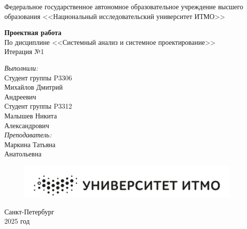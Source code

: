 \documentclass[12pt]{report}
\begin{document}
	
	\begin{titlepage}
		\begin{center}
			\large{Федеральное государственное автономное образовательное учреждение высшего образования <<Национальный исследовательский университет ИТМО>>}
		\end{center}
		
		\vspace{15em}
		
		\begin{center}
			\huge{\textbf{Проектная работа}} \\
			\large{По дисциплине <<Системный анализ и системное проектирование>>} \\
			\large{Итерация №1}
		\end{center}
		
		\vspace{2em}
		
		\begin{flushright}
			\textit{\large{Выполнили:}} \\
			\large{Студент группы P3306} \\
			\large{Михайлов Дмитрий} \\
			\large{Андреевич} \\
			
			\large{Студент группы P3312} \\
			\large{Малышев Никита} \\
			\large{Александрович} \\
			\textit{\large{Преподаватель:}} \\
			\large{Маркина Татьяна} \\
			\large{Анатольевна}
		\end{flushright}
		
		\vspace{2cm}
		
		\begin{figure}[h]
			\centering
			\includegraphics[width=0.5\linewidth]{image.png}
		\end{figure}
		
		\begin{center}
			Санкт-Петербург \\
			2025 год
		\end{center}
	\end{titlepage}
	
	\tableofcontents
	\newpage
	
\end{document}
